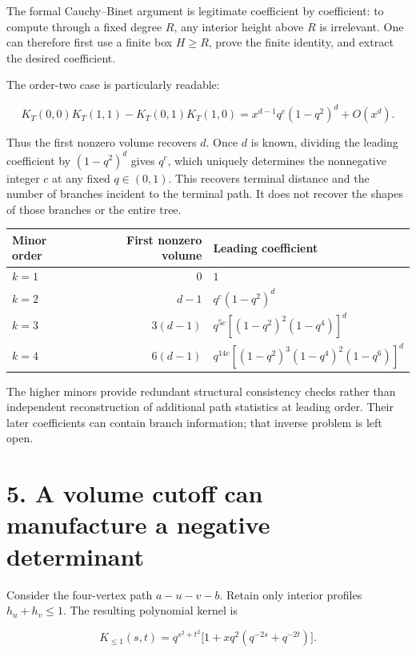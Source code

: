 \documentclass[
  11pt,
  a4paper,
]{report}
\begin{document}
The formal Cauchy--Binet argument is legitimate coefficient by
coefficient: to compute through a fixed degree \(R\), any interior
height above \(R\) is irrelevant. One can therefore first use a finite
box \(H\ge R\), prove the finite identity, and extract the desired
coefficient.

The order-two case is particularly readable:

\[
\boxed{
K_T(0,0)K_T(1,1)-K_T(0,1)K_T(1,0)
=x^{d-1}q^c(1-q^2)^d+O(x^d).
}
\]

Thus the first nonzero volume recovers \(d\). Once \(d\) is known,
dividing the leading coefficient by \((1-q^2)^d\) gives \(q^c\), which
uniquely determines the nonnegative integer \(c\) at any fixed
\(q\in(0,1)\). This recovers terminal distance and the number of
branches incident to the terminal path. It does not recover the shapes
of those branches or the entire tree.

\begin{longtable}[]{@{}lrl@{}}
\toprule\noalign{}
Minor order & First nonzero volume & Leading coefficient \\
\midrule\noalign{}
\endhead
\bottomrule\noalign{}
\endlastfoot
\(k=1\) & \(0\) & \(1\) \\
\(k=2\) & \(d-1\) & \(q^c(1-q^2)^d\) \\
\(k=3\) & \(3(d-1)\) & \(q^{5c}[(1-q^2)^2(1-q^4)]^d\) \\
\(k=4\) & \(6(d-1)\) & \(q^{14c}[(1-q^2)^3(1-q^4)^2(1-q^6)]^d\) \\
\end{longtable}

The higher minors provide redundant structural consistency checks rather
than independent reconstruction of additional path statistics at leading
order. Their later coefficients can contain branch information; that
inverse problem is left open.

\hypertarget{a-volume-cutoff-can-manufacture-a-negative-determinant}{%
\section{5. A volume cutoff can manufacture a negative
determinant}\label{a-volume-cutoff-can-manufacture-a-negative-determinant}}

Consider the four-vertex path \(a-u-v-b\). Retain only interior profiles
\(h_u+h_v\le1\). The resulting polynomial kernel is

\[
K_{\le1}(s,t)=q^{s^2+t^2}
\bigl[1+xq^2(q^{-2s}+q^{-2t})\bigr].
\]
\end{document}
